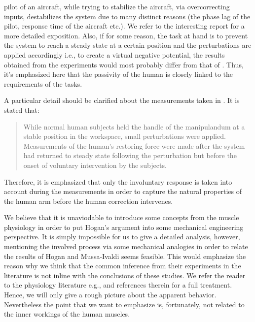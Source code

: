 pilot of an aircraft, while trying to stabilize the aircraft, via overcorrecting inputs, destabilizes the system due to many distinct 
reasons (the phase lag of the pilot, response time of the aircraft etc.). We refer to the interesting report \cite{mcruer} for a more 
detailed exposition. Also, if for some reason, the task at hand is to prevent the system to reach a steady state at a certain position 
and the perturbations are applied accordingly i.e., to create a virtual negative potential, the results obtained from the experiments 
would most probably differ from that of \cite{mussa85}. Thus, it's emphasized here that the passivity of the human is closely linked 
to the requirements of the tasks. 


\begin{rem}\label{rem:filament}
A particular detail should be clarified about the measurements taken in \cite{hogan89}. It is stated that: 
\begin{quote}
While normal human subjects held the handle of the manipulandum at a stable position
in the workspace, small perturbations were applied. Measurements
of the human's restoring force were made after the system
had returned to steady state following the perturbation but before
the onset of voluntary intervention by the subjects.
\end{quote}
Therefore, it is emphasized that only the involuntary response is taken into account during the measurements in order to
capture the natural properties of the human arm before the human correction intervenes. 
%
%
\end{rem}

We believe that it is unaviodable to introduce some concepts from the muscle physiology in order to put Hogan's 
argument into some mechanical engineering perspective. It is simply impossible for us to give a detailed analysis, 
however, mentioning the involved process via some mechanical analogies in order to relate the results of 
Hogan and Mussa-Ivaldi seems feasible. This would emphasize the reason why we think that the common inference 
from their experiments in the literature is not inline with the conclusions of these studies. We refer the reader 
to the physiology literature e.g., \cite{spudich,millman,offer,horowits,yildiz,geeves} and references therein for a full 
treatment. Hence, we will only give a rough picture about the apparent behavior. Nevertheless the point that we want 
to emphasize is, fortunately, not related to the inner workings of the human muscles.


